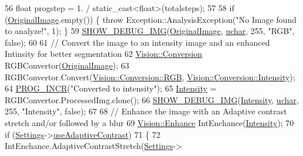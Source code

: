 \begin{DoxyCode}
56         \textcolor{keywordtype}{float} progstep = 1. / \textcolor{keyword}{static\_cast<}\textcolor{keywordtype}{float}\textcolor{keyword}{>}(totalsteps);
57 
58         \textcolor{keywordflow}{if} (\hyperlink{class_soil_analyzer_1_1_sample_a0d6e6fca9e232a77329daf0b4b29c634}{OriginalImage}.empty()) \{ \textcolor{keywordflow}{throw} Exception::AnalysisException(\textcolor{stringliteral}{"No Image found to
       analyze!"}, 1); \}
59         \hyperlink{_vision_debug_8h_aae864fa4f990213a4184a209ff236202}{SHOW\_DEBUG\_IMG}(\hyperlink{class_soil_analyzer_1_1_sample_a0d6e6fca9e232a77329daf0b4b29c634}{OriginalImage}, \hyperlink{_soil_math_types_8h_a65f85814a8290f9797005d3b28e7e5fc}{uchar}, 255, \textcolor{stringliteral}{"RGB"}, \textcolor{keyword}{false});
60 
61         \textcolor{comment}{// Convert the image to an intensity image and an enhanced Intinsity for better segmentation}
62         \hyperlink{class_vision_1_1_conversion}{Vision::Conversion} RGBConvertor(\hyperlink{class_soil_analyzer_1_1_sample_a0d6e6fca9e232a77329daf0b4b29c634}{OriginalImage});
63         RGBConvertor.Convert(\hyperlink{class_vision_1_1_conversion_a0a21d4ccbb013185f1974d35ec86e388af3fab43e1e6d8ffab1bf27050866a8d5}{Vision::Conversion::RGB}, 
      \hyperlink{class_vision_1_1_conversion_a0a21d4ccbb013185f1974d35ec86e388abfa5e56d2444f73ce850195468885fdd}{Vision::Conversion::Intensity});
64         \hyperlink{_sample_8h_a46c89e6320d3c886c2726161399fed91}{PROG\_INCR}(\textcolor{stringliteral}{"Converted to intensity"});
65         \hyperlink{class_soil_analyzer_1_1_soil_a6f56200f2722df5b849d8cddd094c852}{Intensity} = RGBConvertor.ProcessedImg.clone();
66         \hyperlink{_vision_debug_8h_aae864fa4f990213a4184a209ff236202}{SHOW\_DEBUG\_IMG}(\hyperlink{class_soil_analyzer_1_1_soil_a6f56200f2722df5b849d8cddd094c852}{Intensity}, \hyperlink{_soil_math_types_8h_a65f85814a8290f9797005d3b28e7e5fc}{uchar}, 255, \textcolor{stringliteral}{"Intensity"}, \textcolor{keyword}{false});
67 
68         \textcolor{comment}{// Enhance the image with an Adaptive contrast stretch and/or followed by a blur}
69         \hyperlink{class_vision_1_1_enhance}{Vision::Enhance} IntEnchance(\hyperlink{class_soil_analyzer_1_1_soil_a6f56200f2722df5b849d8cddd094c852}{Intensity});
70         \textcolor{keywordflow}{if} (\hyperlink{class_soil_analyzer_1_1_sample_a31f7b29fc46497f9b2847285c7893832}{Settings}->\hyperlink{class_soil_analyzer_1_1_soil_settings_a0e27335d05aed8f3f084744062368578}{useAdaptiveContrast})
71         \{
72             IntEnchance.AdaptiveContrastStretch(\hyperlink{class_soil_analyzer_1_1_sample_a31f7b29fc46497f9b2847285c7893832}{Settings}->

\end{DoxyCode}
